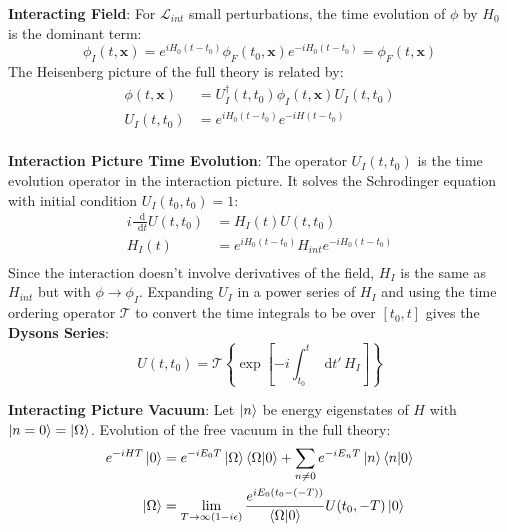 \documentclass[12pt]{article}
\newcommand{\diff}{\mathop{}\!\mathrm{d}}
\theoremstyle{definition}
\begin{document}
\textbf{Interacting Field}: For $\mathcal{L}_{int}$ small perturbations, the time evolution of
$\phi$ by $H_0$ is the dominant term:
\begin{equation*}
    \phi_I(t, \bm{x}) = e^{iH_0 (t-t_0)} \phi_F(t_0, \bm{x}) e^{-iH_0(t-t_0)} = \phi_F(t, \bm{x})
\end{equation*}
The Heisenberg picture of the full theory is related by:
\begin{equation*}
\begin{split}
    \phi(t, \bm{x})
        &= U_I^\dagger(t, t_0) \phi_I(t, \bm{x}) U_I(t,t_0) \\
    U_I(t,t_0) &= e^{iH_0(t-t_0)} e^{-iH(t-t_0)} \\
\end{split}
\end{equation*}

\textbf{Interaction Picture Time Evolution}: The operator $U_I(t,t_0)$ is the time evolution operator
in the interaction picture. It solves the Schrodinger equation with initial condition $U_I(t_0, t_0) = 1$:
\begin{equation*}
\begin{split}
    i \frac{\diff }{\diff t} U(t,t_0) &= H_I(t) U(t, t_0) \\
    H_I(t) &= e^{iH_0(t-t_0)} H_{int} e^{-iH_0(t-t_0)} \\
\end{split}
\end{equation*}
Since the interaction doesn't involve derivatives of the field, $H_I$ is the same as $H_{int}$ but with
$\phi \to \phi_I$. Expanding $U_I$ in a power series of $H_I$ and using the time ordering operator $\mathcal{T}$
to convert the time integrals to be over $[t_0, t]$ gives the \textbf{Dysons Series}:
\begin{equation*}
    U(t,t_0) = \mathcal{T} \left\{ \exp\left[ -i \int_{t_0}^{t} \diff t' \, H_I \right]  \right\} 
\end{equation*}

\textbf{Interacting Picture Vacuum}: Let $\ket{n}$ be energy eigenstates of $H$ with $\ket{n=0} = \ket{\Omega}$.
Evolution of the free vacuum in the full theory:
\begin{equation*}
\begin{split}
    e^{-iHT} \ket{0}
        &= e^{-iE_0 T} \ket{\Omega} \braket{\Omega|0} + \sum_{n \neq 0} e^{-iE_n T} \ket{n} \braket{n|0} \\
    \ket{\Omega}
        &= \lim_{T \to \infty(1-i\epsilon)} \frac{e^{iE_0(t_0 - (-T))}}{\braket{\Omega|0}} U(t_0, -T) \ket{0} \\
\end{split}
\end{equation*}
\end{document}
